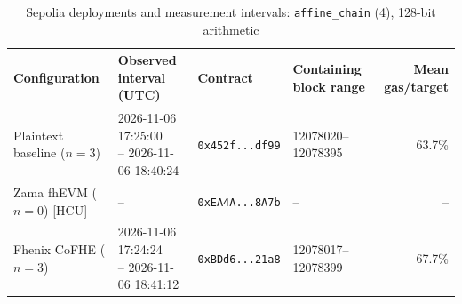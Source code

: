\begin{table}[!t]
\caption{Sepolia deployments and measurement intervals: \texttt{affine\_chain} (4), 128-bit arithmetic}
\label{tab:sepolia-experiment-deployments-circuits-euint128-circuits-w128-affine-chain-k4}
\centering
\footnotesize
\setlength{\tabcolsep}{4pt}
\begin{tabular}{|l|l|l|l|r|}
\hline
\textbf{Configuration} &
\textbf{Observed interval (UTC)} &
\textbf{Contract} &
\textbf{Containing block range} &
\textbf{Mean gas/target} \\
\hline
Plaintext baseline (\(n=3\)) &
\shortstack[l]{2026-11-06 17:25:00 \\ -- 2026-11-06 18:40:24} &
\texttt{0x452f...df99} &
12078020--12078395 &
63.7\% \\
\hline
Zama fhEVM (\(n=0\)) [HCU] &
-- &
\texttt{0xEA4A...8A7b} &
-- &
-- \\
\hline
Fhenix CoFHE (\(n=3\)) &
\shortstack[l]{2026-11-06 17:24:24 \\ -- 2026-11-06 18:41:12} &
\texttt{0xBDd6...21a8} &
12078017--12078399 &
67.7\% \\
\hline
\end{tabular}
\end{table}
